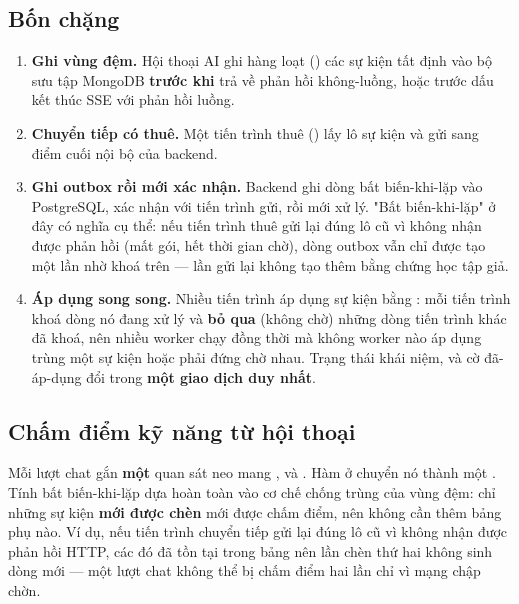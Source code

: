 \subsection{Bốn chặng}

\begin{enumerate}[leftmargin=1.4em]
  \item \textbf{Ghi vùng đệm.} Hội thoại AI ghi hàng loạt () các sự kiện
  tất định vào bộ sưu tập MongoDB  \textbf{trước khi}
  trả về phản hồi không-luồng, hoặc trước dấu kết thúc SSE với phản hồi luồng.
  \item \textbf{Chuyển tiếp có thuê.} Một tiến trình thuê () lấy lô sự
  kiện và gửi sang điểm cuối nội bộ của backend.
  \item \textbf{Ghi outbox rồi mới xác nhận.} Backend ghi dòng  bất biến-khi-lặp
  vào PostgreSQL, xác nhận với tiến trình gửi, rồi mới xử lý. "Bất biến-khi-lặp" ở đây có
  nghĩa cụ thể: nếu tiến trình thuê gửi lại đúng lô cũ vì không nhận được phản hồi (mất gói,
  hết thời gian chờ), dòng outbox vẫn chỉ được tạo một lần nhờ khoá trên  —
  lần gửi lại không tạo thêm bằng chứng học tập giả.
  \item \textbf{Áp dụng song song.} Nhiều tiến trình áp dụng sự kiện bằng
  : mỗi tiến trình khoá dòng nó đang xử lý và \textbf{bỏ qua}
  (không chờ) những dòng tiến trình khác đã khoá, nên nhiều worker chạy đồng thời mà không
  worker nào áp dụng trùng một sự kiện hoặc phải đứng chờ nhau. Trạng thái khái niệm,
   và cờ đã-áp-dụng đổi trong \textbf{một giao dịch duy nhất}.
\end{enumerate}

\subsection{Chấm điểm kỹ năng từ hội thoại}

Mỗi lượt chat gắn \textbf{một} quan sát neo mang ,  và
. Hàm  ở
 chuyển nó thành một . Tính bất
biến-khi-lặp dựa hoàn toàn vào cơ chế chống trùng  của vùng đệm: chỉ những
sự kiện \textbf{mới được chèn} mới được chấm điểm, nên không cần thêm bảng phụ nào. Ví dụ,
nếu tiến trình chuyển tiếp gửi lại đúng lô cũ vì không nhận được phản hồi HTTP, các
 đó đã tồn tại trong bảng nên lần chèn thứ hai không sinh dòng mới — một
lượt chat không thể bị chấm điểm hai lần chỉ vì mạng chập chờn.

